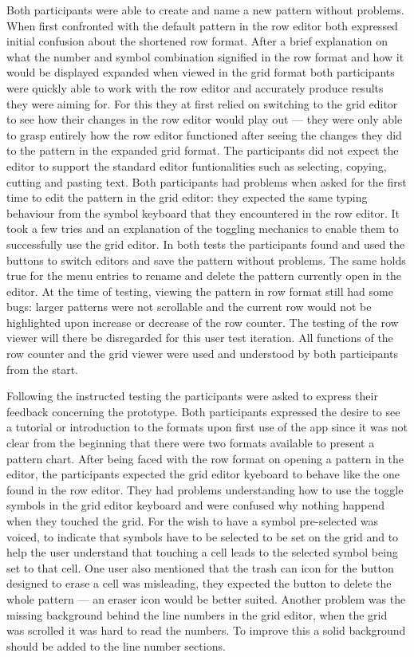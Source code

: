 Both participants were able to create and name a new pattern without problems. When first confronted with the default pattern in the row editor both expressed initial confusion about the shortened row format. After a brief explanation on what the number and symbol combination signified in the row format and how it would be displayed expanded when viewed in the grid format both participants were quickly able to work with the row editor and accurately produce results they were aiming for. For this they at first relied on switching to the grid editor to see how their changes in the row editor would play out --- they were only able to grasp entirely how the row editor functioned after seeing the changes they did to the pattern in the expanded grid format. The participants did not expect the editor to support the standard editor funtionalities such as selecting, copying, cutting and pasting text. 
Both participants had problems when asked for the first time to edit the pattern in the grid editor: they expected the same typing behaviour from the symbol keyboard that they encountered in the row editor. It took a few tries and an explanation of the toggling mechanics to enable them to successfully use the grid editor. In both tests the participants found and used the buttons to switch editors and save the pattern without problems. The same holds true for the menu entries to rename and delete the pattern currently open in the editor.
At the time of testing, viewing the pattern in row format still had some bugs: larger patterns were not scrollable and the current row would not be highlighted upon increase or decrease of the row counter. The testing of the row viewer will there be disregarded for this user test iteration. All functions of the row counter and the grid viewer were used and understood by both participants from the start. 

Following the instructed testing the participants were asked to express their feedback concerning the prototype. Both participants expressed the desire to see a tutorial or introduction to the formats upon first use of the app since it was not clear from the beginning that there were two formats available to present a pattern chart. After being faced with the row format on opening a pattern in the editor, the participants expected the grid editor kyeboard to behave like the one found in the row editor. They had problems understanding how to use the toggle symbols in the grid editor keyboard and were confused why nothing happend when they touched the grid. For the wish to have a symbol pre-selected was voiced, to indicate that symbols have to be selected to be set on the grid and to help the user understand that touching a cell leads to the selected symbol being set to that cell. One user also mentioned that the trash can icon for the button designed to erase a cell was misleading, they expected the button to delete the whole pattern --- an eraser icon would be better suited. Another problem was the missing background behind the line numbers in the grid editor, when the grid was scrolled it was hard to read the numbers. To improve this a solid background should be added to the line number sections. 

